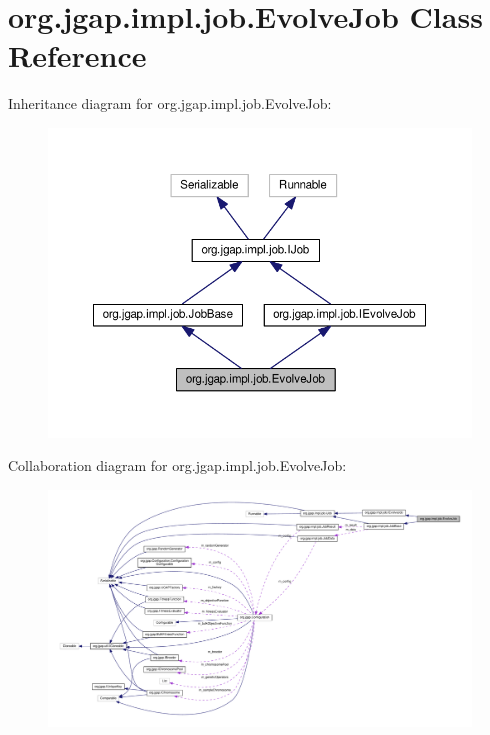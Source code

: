 \hypertarget{classorg_1_1jgap_1_1impl_1_1job_1_1_evolve_job}{\section{org.\-jgap.\-impl.\-job.\-Evolve\-Job Class Reference}
\label{classorg_1_1jgap_1_1impl_1_1job_1_1_evolve_job}
}


Inheritance diagram for org.\-jgap.\-impl.\-job.\-Evolve\-Job\-:
\nopagebreak
\begin{figure}[H]
\begin{center}
\leavevmode
\includegraphics[width=350pt]{classorg_1_1jgap_1_1impl_1_1job_1_1_evolve_job__inherit__graph}
\end{center}
\end{figure}


Collaboration diagram for org.\-jgap.\-impl.\-job.\-Evolve\-Job\-:
\nopagebreak
\begin{figure}[H]
\begin{center}
\leavevmode
\includegraphics[width=350pt]{classorg_1_1jgap_1_1impl_1_1job_1_1_evolve_job__coll__graph}
\end{center}
\end{figure}
